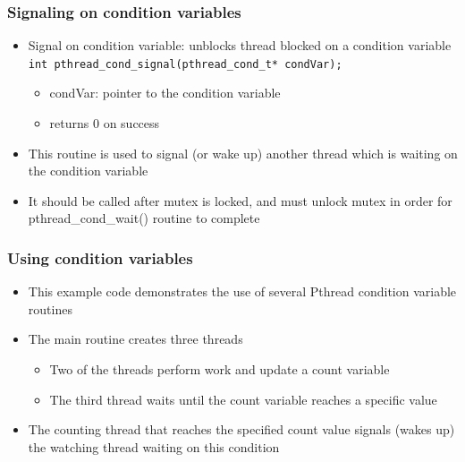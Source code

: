 \subsubsection{Signaling on condition variables}
\begin{itemize}
  \item Signal on condition variable: unblocks thread blocked on a condition variable\newline
  \lstinline{int pthread_cond_signal(pthread_cond_t* condVar);}
  \begin{itemize}
    \item condVar: pointer to the condition variable
    \item returns 0 on success
  \end{itemize}
  \item This routine is used to signal (or wake up) another thread which is waiting on the condition variable
  \item It should be called after mutex is locked, and must unlock mutex in order for pthread\_cond\_wait() routine to complete
\end{itemize}

\subsubsection{Using condition variables}
\begin{itemize}
  \item This example code demonstrates the use of several Pthread condition variable routines
  \item The main routine creates three threads
  \begin{itemize}
    \item Two of the threads perform work and update a count variable
    \item The third thread waits until the count variable reaches a specific value
  \end{itemize}
  \item The counting thread that reaches the specified count value signals (wakes up) the watching thread waiting on this condition
\end{itemize}





